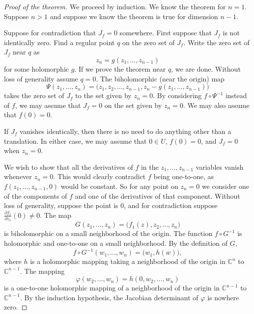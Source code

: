 \documentclass[12pt,openany]{book}
\newcommand{\C}{{\mathbb{C}}}
\theoremstyle{plain}
\theoremstyle{remark}
\theoremstyle{definition}
\theoremstyle{exercise}
\theoremstyle{example}
\begin{document}
\begin{proof}[Proof of the theorem]
We proceed by induction.  We know the theorem for $n=1$.
Suppose $n > 1$ and suppose we know the theorem is true for dimension $n-1$.

Suppose for contradiction that $J_f = 0$ somewhere.
First suppose that $J_f$ is not identically zero.
Find a regular point $q$ on the zero set of $J_f$.
Write the zero set of $J_f$ near $q$ as
\begin{equation*}
z_n = g(z_1,\ldots,z_{n-1})
\end{equation*}
for some holomorphic $g$.
If we prove the theorem near $q$, we are done.  Without loss of generality
assume $q=0$.  The biholomorphic (near the origin) map
\begin{equation*}
\Psi(z_1,\ldots,z_n) = \bigl(z_1,z_2,\ldots,z_{n-1},z_n-g(z_1,\ldots,z_{n-1}) \bigr)
\end{equation*}
takes the zero set of $J_f$ to the set given by $z_n=0$.  By considering
$f \circ \Psi^{-1}$ instead of $f$, we may assume
that $J_f = 0$ on the set given by $z_n=0$.  We may also
assume that $f(0) = 0$.

If $J_f$ vanishes identically, then there is no need to do anything other
than a translation.  In either case,
we may assume that $0 \in U$, $f(0)=0$, and
$J_f = 0$ when $z_n=0$.

We wish to show that all the derivatives of $f$ in the $z_1,\ldots,z_{n-1}$
variables vanish whenever $z_n = 0$.  This
would clearly contradict $f$ being one-to-one,
as $f(z_1,\ldots,z_{n-1},0)$ would be constant.
So for any point on $z_n=0$ we consider one of the components
of $f$ and one of the derivatives of that component.
Without loss of generality, suppose the point is 0, and
for contradiction suppose
$\frac{\partial f_1}{\partial z_1}(0) \not= 0$.
The map
\begin{equation*}
G(z_1,\ldots,z_n) = \bigl(f_1(z),z_2,\ldots,z_n\bigr)
\end{equation*}
is biholomorphic on a small neighborhood of the origin.
The function $f \circ G^{-1}$ is holomorphic and one-to-one on a small
neighborhood.  By the definition of $G$,
\begin{equation*}
f \circ G^{-1} (w_1,\ldots,w_n) = \bigl(w_1,h(w)\bigr) ,
\end{equation*}
where $h$ is a holomorphic mapping taking a neighborhood of the
origin in $\C^n$ to $\C^{n-1}$.
The mapping
\begin{equation*}
\varphi(w_2,\ldots,w_n) = h(0,w_2,\ldots,w_n)
\end{equation*}
is a one-to-one holomorphic mapping of a neighborhood of the origin in
$\C^{n-1}$ to $\C^{n-1}$.  By the induction hypothesis, the Jacobian determinant of
$\varphi$ is nowhere zero.


\end{proof}
\end{document}

